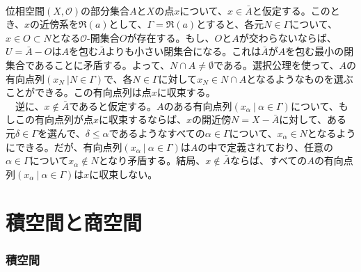 \documentclass{jsarticle}
\begin{document}
\subsection{}
位相空間$(X,\mathcal{O})$の部分集合$A$と$X$の点$x$について、$x\in\bar{A}$と仮定する。このとき、$x$の近傍系を$\mathfrak{R}(a)$として、$\Gamma=\mathfrak{R}(a)$とすると、各元$N\in\Gamma$について、$x\in O\subset N$となる$\mathcal{O}$-開集合$O$が存在する。もし、$O$と$A$が交わらないならば、$U=\bar{A}-O$は$A$を包む$\bar{A}$よりも小さい閉集合になる。これは$\bar{A}$が$A$を包む最小の閉集合であることに矛盾する。よって、$N\cap A\neq\emptyset$である。選択公理を使って、$A$の有向点列$(x_N\ | N\in\Gamma)$で、各$N\in\Gamma$に対して$x_N\in N\cap A$となるようなものを選ぶことができる。この有向点列は点$x$に収束する。\\
　逆に、$x\notin \bar{A}$であると仮定する。$A$のある有向点列$(x_\alpha\ |\ \alpha\in\Gamma)$について、もしこの有向点列が点$x$に収束するならば、$x$の開近傍$N=X-\bar{A}$に対して、ある元$\delta\in\Gamma$を選んで、$\delta\leq\alpha$であるようなすべての$\alpha\in\Gamma$について、$x_\alpha\in N$となるようにできる。だが、有向点列$(x_\alpha\ |\ \alpha\in\Gamma)$は$A$の中で定義されており、任意の$\alpha\in\Gamma$について$x_\alpha\notin N$となり矛盾する。結局、$x\notin\bar{A}$ならば、すべての$A$の有向点列$(x_\alpha\ |\ \alpha\in\Gamma)$は$x$に収束しない。






\part{積空間と商空間}
\section{積空間}
\end{document}
